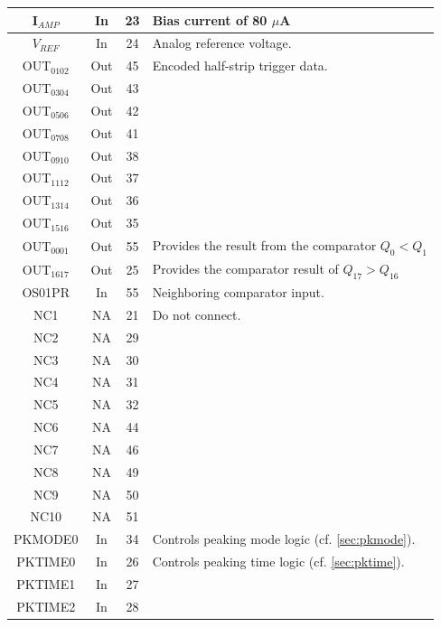 \documentclass[letterpaper]{article}
\begin{document}
\begin{center}
\begin{tabular}{ | c | c | c | l | }
I$_{AMP}$ & In & 23 & Bias current of 80 $\mu$A \\
\hline
$V_{REF}$ & In & 24 & Analog reference voltage. \\
\hline
OUT$_{0102}$ & Out & 45 & Encoded half-strip trigger data. \\
OUT$_{0304}$ & Out & 43 &  \\
OUT$_{0506}$ & Out & 42 &  \\
OUT$_{0708}$ & Out & 41 &  \\
OUT$_{0910}$ & Out & 38 &  \\
OUT$_{1112}$ & Out & 37 &  \\
OUT$_{1314}$ & Out & 36 &  \\
OUT$_{1516}$ & Out & 35 &  \\
\hline
OUT$_{0001}$ & Out & 55 & Provides the result from the comparator $Q_{0}<Q_{1}$ \\
OUT$_{1617}$ & Out & 25 & Provides the comparator result of $Q_{17}>Q_{16}$ \\
\hline
OS01PR & In & 55 & Neighboring comparator input. \\
\hline
NC1 & NA & 21 & Do not connect. \\
NC2 & NA & 29 &  \\
NC3 & NA & 30 &  \\
NC4 & NA & 31 &  \\
NC5 & NA & 32 &  \\
NC6 & NA & 44 &  \\
NC7 & NA & 46 &  \\
NC8 & NA & 49 &  \\
NC9 & NA & 50 &  \\
NC10 & NA & 51 &  \\
\hline
PKMODE0 & In & 34 & Controls peaking mode logic (cf. \autoref{sec:pkmode}). \\
\hline
PKTIME0 & In & 26 & Controls peaking time logic (cf. \autoref{sec:pktime}). \\
PKTIME1 & In & 27 &  \\
PKTIME2 & In & 28 &  \\
\hline
\end{tabular}
\end{center}
\normalsize
\end{document}

